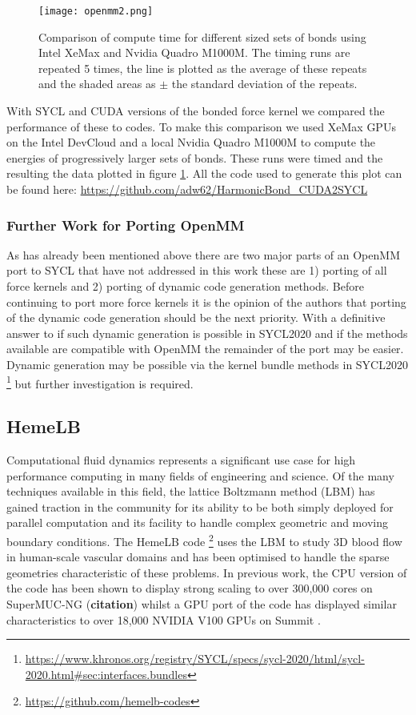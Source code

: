 \begin{figure}
	\caption{Comparison of compute time for different sized sets of bonds using Intel XeMax and Nvidia Quadro M1000M. The timing runs are repeated 5 times, the line is plotted as the average of these repeats and the shaded areas as $\pm$ the standard deviation of the repeats.}
	\texttt{[image: openmm2.png]}
	\label{fig:openmm}
\end{figure}

With SYCL and CUDA versions of the bonded force kernel we compared the performance of these to codes. To make this comparison we used XeMax GPUs on the Intel DevCloud and a local Nvidia Quadro M1000M to compute the energies of progressively larger sets of bonds. These runs were timed and the resulting the data plotted in figure \ref{fig:openmm}. All the code used to generate this plot can be found here: \url{https://github.com/adw62/HarmonicBond_CUDA2SYCL}

\subsubsection{Further Work for Porting OpenMM}

As has already been mentioned above there are two major parts of an OpenMM port to SYCL that have not addressed in this work these are 1) porting of all force kernels and 2) porting of dynamic code generation methods. Before continuing to port more force kernels it is the opinion of the authors that porting of the dynamic code generation should be the next priority. With a definitive answer to if such dynamic generation is possible in SYCL2020 and if the methods available are compatible with OpenMM the remainder of the port may be easier. Dynamic generation may be possible via the kernel bundle methods in SYCL2020 \footnote{\url{https://www.khronos.org/registry/SYCL/specs/sycl-2020/html/sycl-2020.html\#sec:interfaces.bundles}} but further investigation is required.


\subsection{HemeLB}
Computational fluid dynamics represents a significant use case for high performance computing in many fields of engineering and science. Of the many techniques available in this field, the lattice Boltzmann method (LBM) has gained traction in the community for its ability to be both simply deployed for parallel computation and its facility to handle complex geometric and moving boundary conditions. The HemeLB code \footnote{\url{https://github.com/hemelb-codes}} uses the LBM to study 3D blood flow in human-scale vascular domains and has been optimised to handle the sparse geometries characteristic of these problems. In previous work, the CPU version of the code has been shown to display strong scaling to over 300,000 cores on SuperMUC-NG (\textbf{citation}) whilst a GPU port of the code has displayed similar characteristics to over 18,000 NVIDIA V100 GPUs on Summit \cite{zacharoudiou_development_2022}.


